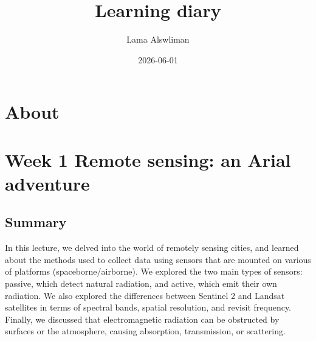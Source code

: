 \documentclass[
  letterpaper,
  DIV=11,
  numbers=noendperiod]{scrreprt}
\title{Learning diary}
\author{Lama Alswliman}
\date{2026-06-01}
\renewcommand*\contentsname{Table of contents}
\newcommand\contentsname{Table of contents}
\begin{document}
\maketitle
\ifdefined\Shaded\renewenvironment{Shaded}{\begin{tcolorbox}[interior hidden, boxrule=0pt, sharp corners, breakable, frame hidden, enhanced, borderline west={3pt}{0pt}{shadecolor}]}{\end{tcolorbox}}\fi

\renewcommand*\contentsname{Table of contents}
{
\hypersetup{linkcolor=}
\setcounter{tocdepth}{2}
\tableofcontents
}

\hypertarget{about}{%
\chapter*{About}\label{about}}



\hypertarget{week-1-remote-sensing-an-arial-adventure}{%
\chapter{Week 1 Remote sensing: an Arial
adventure}\label{week-1-remote-sensing-an-arial-adventure}}

\hypertarget{summary}{%
\section{Summary}\label{summary}}

In this lecture, we delved into the world of remotely sensing cities,
and learned about the methods used to collect data using sensors that
are mounted on various of platforms (spaceborne/airborne). We explored
the two main types of sensors: passive, which detect natural radiation,
and active, which emit their own radiation. We also explored the
differences between Sentinel 2 and Landsat satellites in terms of
spectral bands, spatial resolution, and revisit frequency. Finally, we
discussed that electromagnetic radiation can be obstructed by surfaces
or the atmosphere, causing absorption, transmission, or scattering.
\end{document}
